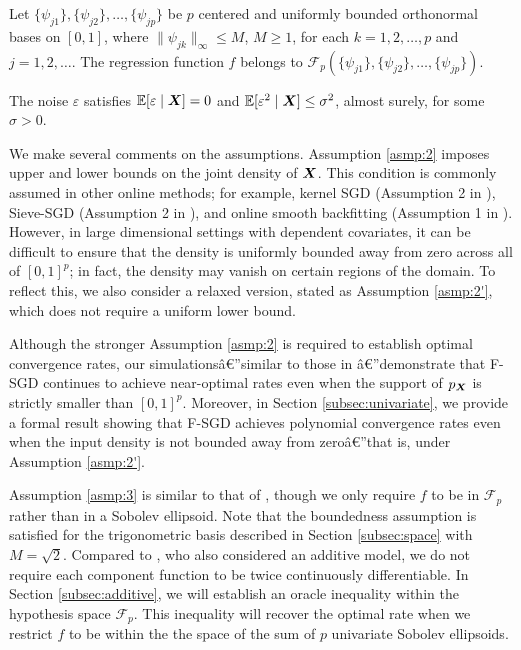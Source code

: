 \renewcommand{\theassumption}{\arabic{assumption}}
\begin{assumption}\label{asmp:3}
     Let $\{\psi_{j1}\},\{\psi_{j2}\},\dots,\{\psi_{jp}\}$ be $p$ centered and uniformly bounded orthonormal bases on $[0,1]$, where $\|\psi_{jk}\|_\infty \leq M $, $M\geq 1$,  for each  $k=1,2,\dots,p$ and $j=1,2,\dots$. The regression function $f$ belongs to $ \mathcal{F}_p(\{\psi_{j1}\},\{\psi_{j2}\},\dots,\{\psi_{jp}\})$.
\end{assumption}

\begin{assumption}\label{asmp:4}
    The noise $\varepsilon$ satisfies $ \mathbb{E}[\varepsilon \mid \bm{X}] = 0 $ and $ \mathbb{E}[\varepsilon^2 \mid \bm{X}] \leq \sigma^2 $, almost surely, for some $ \sigma > 0 $. 
\end{assumption}
 
We make several comments on the assumptions. 
Assumption \ref{asmp:2} imposes upper and lower bounds on the joint density of $\bm{X}$. This condition is commonly assumed in other online methods; for example, kernel SGD (Assumption 2 in \cite{4406a3ce-1e59-3ed8-8c25-9f7d75b81f14}), Sieve-SGD (Assumption 2 in \cite{zhang2022sieve}), and online smooth backfitting (Assumption 1 in \cite{doi:10.1080/01621459.2023.2182213}). However, in large dimensional settings with dependent covariates, it can be difficult to ensure that the density is uniformly bounded away from zero across all of $[0,1]^p$; in fact, the density may vanish on certain regions of the domain. To reflect this, we also consider a relaxed version, stated as Assumption \ref{asmp:2'}, which does not require a uniform lower bound. 

Although the stronger Assumption \ref{asmp:2} is required to establish optimal convergence rates, our simulationsâ€”similar to those in \cite{zhang2022sieve}â€”demonstrate that F-SGD continues to achieve near-optimal rates even when the support of $p_{\bm{X}}$ is strictly smaller than $[0,1]^p$. Moreover, in Section \ref{subsec:univariate}, we provide a formal result showing that F-SGD achieves polynomial convergence rates even when the input density is not bounded away from zeroâ€”that is, under Assumption \ref{asmp:2'}.

Assumption \ref{asmp:3} is similar to that of \cite{zhang2022sieve}, though we only require $f$ to be in $\mathcal{F}_p$ rather than in a Sobolev ellipsoid. Note that the boundedness assumption is satisfied for the trigonometric basis described in Section \ref{subsec:space} with $ M = \sqrt{2} $.
Compared to \cite{doi:10.1080/01621459.2023.2182213}, who also considered an additive model, we do not require each component function to be twice continuously differentiable. In Section \ref{subsec:additive}, we will establish an oracle inequality within the hypothesis space $\mathcal{F}_p$. This inequality will recover the optimal rate when we restrict $f$ to be within the the space of the sum of $p$ univariate Sobolev ellipsoids. 

